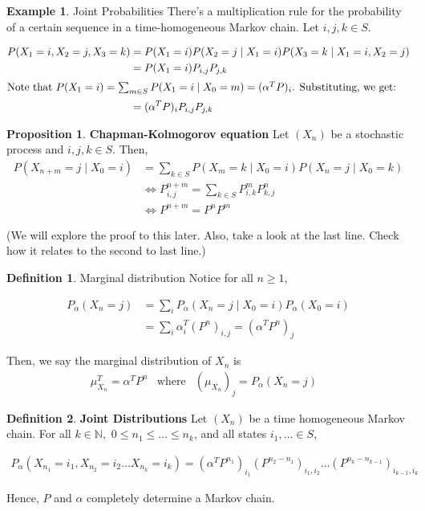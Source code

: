 \documentclass[12pt]{article}
\theoremstyle{definition}
\newtheorem{definition}{Definition}[section]
\newtheorem{proposition}{Proposition}[section]
\newtheorem{example}{Example}[section]
\begin{document}
\begin{example}{Joint Probabilities}
  There's a multiplication rule for the probability of a certain sequence in a time-homogeneous Markov chain. Let $i,j,k \in S$.

  \begin{align*}
    P(X_1=i, X_2=j, X_3=k) &= P(X_1=i)P(X_2 = j \mid X_1 = i)P(X_3=k \mid X_1 = i, X_2 = j) \\
    &= P(X_1 = i)P_{i,j}P_{j,k} \\
    \intertext{Note that $P(X_1 = i) = \sum_{m \in S} P(X_1 =i \mid X_0 = m) = (\alpha^T P)_i$. Substituting, we get:}
    &=(\alpha^T P)_i P_{i,j}P_{j,k}
  \end{align*}
\end{example}



\begin{proposition}{\textbf{Chapman-Kolmogorov equation}}
  Let $(X_n)$ be a stochastic process and $i,j,k \in S$. Then,
  \begin{align*}
    P(X_{n+m} = j \mid X_0 = i) &= \sum_{k \in S}P(X_m = k \mid X_0 = i)P(X_n = j \mid X_0 = k) \\
    &\iff P_{i,j}^{n+m} = \sum_{k \in S} P_{i,k}^mP_{k,j}^n \\
    &\iff P^{n+m} = P^nP^m
  \end{align*}
\end{proposition}

(We will explore the proof to this later. Also, take a look at the last line. Check how it relates to the second to last line.)


\begin{definition}{Marginal distribution}
  Notice for all $n \geq 1$,

  \begin{align*}
    P_{\alpha}(X_n = j) &= \sum_iP_{\alpha}(X_n = j \mid X_0 = i)P_{\alpha}(X_0 = i) \\
    &= \sum_i \alpha_i^T (P^n)_{i,j} = (\alpha^T P^n)_j
  \end{align*}

Then, we say the marginal distribution of $X_n$ is
\begin{align*}
  \mu_{X_n}^T = \alpha^TP^n & \text{where} & (\mu_{X_n})_j = P_{\alpha}(X_n = j)&
\end{align*}

\end{definition}


\begin{definition}{\textbf{Joint Distributions}}
  Let $(X_n)$ be a time homogeneous Markov chain. For all $k \in \mathbb{N},$ $0 \leq n_1 \leq \dots \leq n_k$, and all states $i_1, \dots \in S$,

  \begin{align*}
    P_{\alpha}(X_{n_1} = i_1, X_{n_2} = i_2 \dots X_{n_k} = i_k) = (\alpha^TP^{n_1})_{i_1}(P^{n_2 - n_1})_{i_1, i_2} \dots  (P^{n_k - n_{k-1}})_{i_{k-1}, i_k}
  \end{align*}

Hence, $P$ and $\alpha$ completely determine a Markov chain.
\end{definition}
\end{document}
